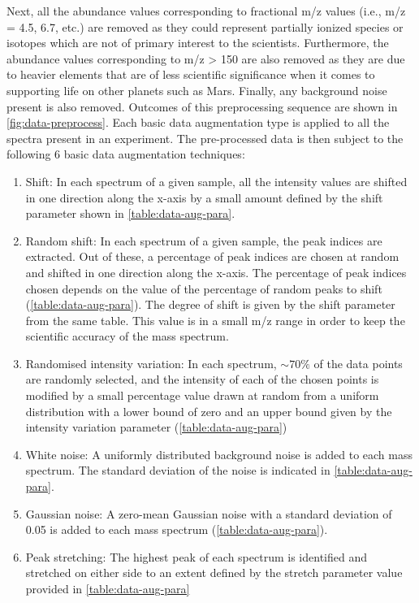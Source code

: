 Next, all the abundance values corresponding to fractional m/z values (i.e., m/z = 4.5, 6.7, etc.) are removed as they could represent partially ionized species or isotopes which are not of primary interest to the scientists. Furthermore, the abundance values corresponding to m/z > 150 are also removed as they are due to heavier elements that are of less scientific significance when it comes to supporting life on other planets such as Mars. Finally, any background noise present is also removed. Outcomes of this preprocessing sequence are shown in \cref{fig:data-preprocess}. Each basic data augmentation type is applied to all the spectra present in an experiment. The pre-processed data is then subject to the following 6 basic data augmentation techniques:

\begin{enumerate}
    \item Shift: In each spectrum of a given sample, all the intensity values are shifted in one direction along the x-axis by a small amount defined by the shift parameter shown in \cref{table:data-aug-para}. 

    \item Random shift: In each spectrum of a given sample, the peak indices are extracted. Out of these, a percentage of peak indices are chosen at random and shifted in one direction along the x-axis. The percentage of peak indices chosen depends on the value of the percentage of random peaks to shift (\cref{table:data-aug-para}). The degree of shift is given by the shift parameter from the same table. This value is in a small m/z range in order to keep the scientific accuracy of the mass spectrum.

    \item Randomised intensity variation: In each spectrum, $\sim 70\%$ of the data points are randomly selected, and the intensity of each of the chosen points is modified by a small percentage value drawn at random from a uniform distribution with a lower bound of zero and an upper bound given by the intensity variation parameter (\cref{table:data-aug-para})

    \item White noise: A uniformly distributed background noise is added to each mass spectrum. The standard deviation of the noise is indicated in \cref{table:data-aug-para}.

    \item Gaussian noise: A zero-mean Gaussian noise with a standard deviation of 0.05 is added to each mass spectrum (\cref{table:data-aug-para}).


    \item Peak stretching: The highest peak of each spectrum is identified and stretched on either side to an extent defined by the stretch parameter value provided in \cref{table:data-aug-para}
\end{enumerate}

